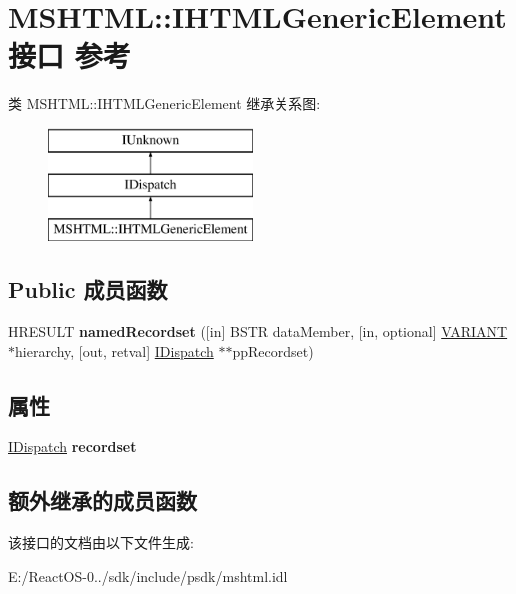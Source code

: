 \hypertarget{interface_m_s_h_t_m_l_1_1_i_h_t_m_l_generic_element}{}\section{M\+S\+H\+T\+ML\+:\+:I\+H\+T\+M\+L\+Generic\+Element接口 参考}
\label{interface_m_s_h_t_m_l_1_1_i_h_t_m_l_generic_element}
类 M\+S\+H\+T\+ML\+:\+:I\+H\+T\+M\+L\+Generic\+Element 继承关系图\+:\begin{figure}[H]
\begin{center}
\leavevmode
\includegraphics[height=3.000000cm]{interface_m_s_h_t_m_l_1_1_i_h_t_m_l_generic_element}
\end{center}
\end{figure}
\subsection*{Public 成员函数}
\begin{DoxyCompactItemize}
\item 
\mbox{\label{interface_m_s_h_t_m_l_1_1_i_h_t_m_l_generic_element_ab513a62f19efd718434d57eed7cd67ef}} 
H\+R\+E\+S\+U\+LT {\bfseries named\+Recordset} (\mbox{[}in\mbox{]} B\+S\+TR data\+Member, \mbox{[}in, optional\mbox{]} \hyperlink{structtag_v_a_r_i_a_n_t}{V\+A\+R\+I\+A\+NT} $\ast$hierarchy, \mbox{[}out, retval\mbox{]} \hyperlink{interface_i_dispatch}{I\+Dispatch} $\ast$$\ast$pp\+Recordset)
\end{DoxyCompactItemize}
\subsection*{属性}
\begin{DoxyCompactItemize}
\item 
\mbox{\label{interface_m_s_h_t_m_l_1_1_i_h_t_m_l_generic_element_a7824083deabe2938d0cce7c9c1cc0fa5}} 
\hyperlink{interface_i_dispatch}{I\+Dispatch} {\bfseries recordset}
\end{DoxyCompactItemize}
\subsection*{额外继承的成员函数}


该接口的文档由以下文件生成\+:\begin{DoxyCompactItemize}
\item 
E\+:/\+React\+O\+S-\/0../sdk/include/psdk/mshtml.\+idl\end{DoxyCompactItemize}

